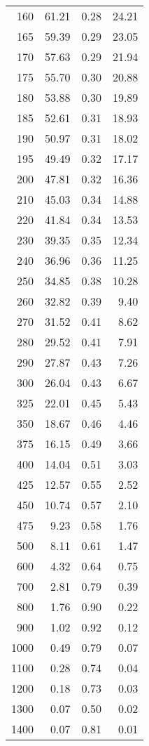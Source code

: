 \begin{table}[ht]
\begin{tabular}{rrrr}
    160 & 61.21 & 0.28 & 24.21 \\ 
    165 & 59.39 & 0.29 & 23.05 \\ 
    170 & 57.63 & 0.29 & 21.94 \\ 
    175 & 55.70 & 0.30 & 20.88 \\ 
    180 & 53.88 & 0.30 & 19.89 \\ 
    185 & 52.61 & 0.31 & 18.93 \\ 
    190 & 50.97 & 0.31 & 18.02 \\ 
    195 & 49.49 & 0.32 & 17.17 \\ 
    200 & 47.81 & 0.32 & 16.36 \\ 
    210 & 45.03 & 0.34 & 14.88 \\ 
    220 & 41.84 & 0.34 & 13.53 \\ 
    230 & 39.35 & 0.35 & 12.34 \\ 
    240 & 36.96 & 0.36 & 11.25 \\ 
    250 & 34.85 & 0.38 & 10.28 \\ 
    260 & 32.82 & 0.39 & 9.40 \\ 
    270 & 31.52 & 0.41 & 8.62 \\ 
    280 & 29.52 & 0.41 & 7.91 \\ 
    290 & 27.87 & 0.43 & 7.26 \\ 
    300 & 26.04 & 0.43 & 6.67 \\ 
    325 & 22.01 & 0.45 & 5.43 \\ 
    350 & 18.67 & 0.46 & 4.46 \\ 
    375 & 16.15 & 0.49 & 3.66 \\ 
    400 & 14.04 & 0.51 & 3.03 \\ 
    425 & 12.57 & 0.55 & 2.52 \\ 
    450 & 10.74 & 0.57 & 2.10 \\ 
    475 & 9.23 & 0.58 & 1.76 \\ 
    500 & 8.11 & 0.61 & 1.47 \\ 
    600 & 4.32 & 0.64 & 0.75 \\ 
    700 & 2.81 & 0.79 & 0.39 \\ 
    800 & 1.76 & 0.90 & 0.22 \\ 
    900 & 1.02 & 0.92 & 0.12 \\ 
   1000 & 0.49 & 0.79 & 0.07 \\ 
   1100 & 0.28 & 0.74 & 0.04 \\ 
   1200 & 0.18 & 0.73 & 0.03 \\ 
   1300 & 0.07 & 0.50 & 0.02 \\ 
   1400 & 0.07 & 0.81 & 0.01 \\ 

\end{tabular}
\end{table}
